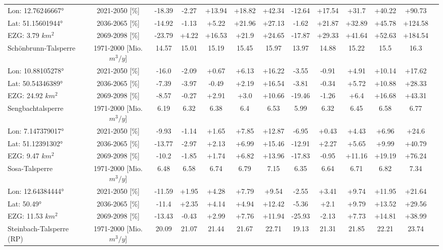 \begin{longtable}{@{\extracolsep{\fill}}lc|ccccc||cccccc}
\cline{2-13} 
Lon: 12.76246667° & 2021-2050 [\%]  & -18.39 & -2.27 & +13.94 & +18.82 & +42.34 & -12.64 & +17.54 & +31.7 & +40.22 & +90.73 & \\ 
Lat: 51.15601944° & 2036-2065 [\%]  & -14.92 & -1.13 & +5.22 & +21.96 & +27.13 & -1.62 & +21.87 & +32.89 & +45.78 & +124.58 & \\ 
EZG: 3.79 $km^2$ & 2069-2098 [\%]  & -23.79 & +4.22 & +16.53 & +21.9 & +24.65 & -17.87 & +29.33 & +41.64 & +52.63 & +184.54 & \\ 
\hline 
Schönbrunn-Talsperre & 1971-2000 [Mio. $m^3/y$]  & 14.57 & 15.01 & 15.19 & 15.45 & 15.97 & 13.97 & 14.88 & 15.22 & 15.5 & 16.3 & \\ 
\cline{2-13} 
Lon: 10.88105278° & 2021-2050 [\%]  & -16.0 & -2.09 & +0.67 & +6.13 & +16.22 & -3.55 & -0.91 & +4.91 & +10.14 & +17.62 & \\ 
Lat: 50.54346389° & 2036-2065 [\%]  & -7.39 & -3.97 & -0.49 & +2.19 & +16.54 & -3.81 & -0.34 & +5.72 & +10.88 & +28.33 & \\ 
EZG: 24.92 $km^2$ & 2069-2098 [\%]  & -8.57 & -0.27 & +2.91 & +3.0 & +10.66 & -19.46 & -1.26 & +6.4 & +16.68 & +43.31 & \\ 
\hline 
Sengbachtalsperre & 1971-2000 [Mio. $m^3/y$]  & 6.19 & 6.32 & 6.38 & 6.4 & 6.53 & 5.99 & 6.32 & 6.45 & 6.58 & 6.77 & \\ 
\cline{2-13} 
Lon: 7.147379017° & 2021-2050 [\%]  & -9.93 & -1.14 & +1.65 & +7.85 & +12.87 & -6.95 & +0.43 & +4.43 & +6.96 & +24.6 & \\ 
Lat: 51.12391302° & 2036-2065 [\%]  & -13.77 & -2.97 & +2.13 & +6.99 & +15.46 & -12.91 & +2.27 & +5.65 & +9.99 & +40.79 & \\ 
EZG: 9.47 $km^2$ & 2069-2098 [\%]  & -10.2 & -1.85 & +1.74 & +6.82 & +13.96 & -17.83 & -0.95 & +11.16 & +19.19 & +76.24 & \\ 
\hline 
Sosa-Talsperre & 1971-2000 [Mio. $m^3/y$]  & 6.48 & 6.58 & 6.74 & 6.79 & 7.15 & 6.35 & 6.64 & 6.71 & 6.82 & 7.34 & \\ 
\cline{2-13} 
Lon: 12.64384444° & 2021-2050 [\%]  & -11.59 & +1.95 & +4.28 & +7.79 & +9.54 & -2.55 & +3.41 & +9.74 & +11.95 & +21.64 & \\ 
Lat: 50.49° & 2036-2065 [\%]  & -11.4 & +2.35 & +4.14 & +4.94 & +12.42 & -5.36 & +2.1 & +9.79 & +13.52 & +29.56 & \\ 
EZG: 11.53 $km^2$ & 2069-2098 [\%]  & -13.43 & -0.43 & +2.99 & +7.76 & +11.94 & -25.93 & -2.13 & +7.73 & +14.81 & +38.99 & \\ 
\hline 
Steinbach-Talsperre (RP) & 1971-2000 [Mio. $m^3/y$]  & 20.09 & 21.07 & 21.44 & 21.67 & 22.71 & 19.13 & 21.31 & 21.85 & 22.21 & 23.74 & \\ 

\end{longtable}
